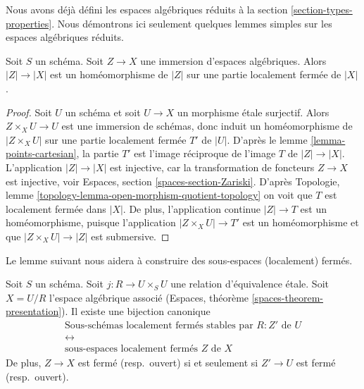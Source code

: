 \noindent
Nous avons déjà défini les espaces algébriques réduits à la
section \ref{section-types-properties}.
Nous démontrons ici seulement quelques lemmes simples sur les espaces
algébriques réduits.

\begin{lemma}
\label{lemma-subspace-induced-topology}
Soit $S$ un schéma. Soit $Z \to X$ une immersion d'espaces algébriques.
Alors $|Z| \to |X|$ est un homéomorphisme de $|Z|$ sur une partie localement fermée
de $|X|$.
\end{lemma}

\begin{proof}
Soit $U$ un schéma et soit $U \to X$ un morphisme \'etale surjectif.
Alors $Z \times_X U \to U$ est une immersion de schémas, donc induit un
homéomorphisme de $|Z \times_X U|$ sur une partie localement fermée $T'$
de $|U|$. D'après le lemme \ref{lemma-points-cartesian}, la partie
$T'$ est l'image réciproque de l'image $T$ de $|Z| \to |X|$.
L'application $|Z| \to |X|$ est injective, car la transformation de
foncteurs $Z \to X$ est injective, voir
Espaces, section \ref{spaces-section-Zariski}. D'après
Topologie, lemme \ref{topology-lemma-open-morphism-quotient-topology}
on voit que $T$ est localement fermée dans $|X|$. De plus, l'application continue
$|Z| \to T$ est un homéomorphisme, puisque l'application $|Z \times_X U| \to T'$
est un homéomorphisme et que $|Z \times_X U| \to |Z|$ est submersive.
\end{proof}

\noindent
Le lemme suivant nous aidera à construire des sous-espaces
(localement) fermés.

\begin{lemma}
\label{lemma-subspaces-presentation}
Soit $S$ un schéma. Soit $j : R \to U \times_S U$ une relation d'équivalence \'etale.
Soit $X = U/R$ l'espace algébrique associé
(Espaces, théorème \ref{spaces-theorem-presentation}). Il existe une
bijection canonique
$$
\begin{gathered}
\text{Sous-schémas localement fermés stables par }R : Z'\text{ de }U\\[2pt]
\leftrightarrow\\[2pt]
\text{sous-espaces localement fermés }Z\text{ de }X
\end{gathered}
$$
De plus, $Z \to X$ est fermé (resp.\ ouvert) si et seulement si
$Z' \to U$ est fermé (resp.\ ouvert).
\end{lemma}

